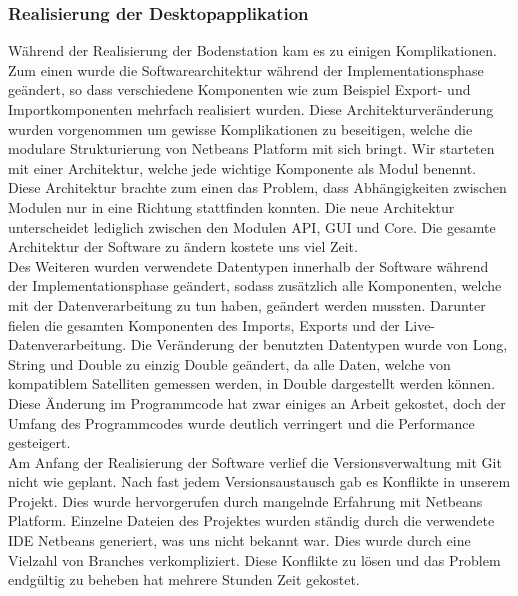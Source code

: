 \subsubsection{Realisierung der Desktopapplikation}
Während der Realisierung der Bodenstation kam es zu einigen Komplikationen. Zum einen wurde die Softwarearchitektur während der Implementationsphase geändert, so dass verschiedene Komponenten wie zum Beispiel Export- und Importkomponenten mehrfach realisiert wurden. Diese Architekturveränderung wurden vorgenommen um gewisse Komplikationen zu beseitigen, welche die modulare Strukturierung von Netbeans Platform mit sich bringt. Wir starteten mit einer Architektur, welche jede wichtige Komponente als Modul benennt. Diese Architektur brachte zum einen das Problem, dass Abhängigkeiten zwischen Modulen nur in eine Richtung stattfinden konnten. Die neue Architektur unterscheidet lediglich zwischen den Modulen API, GUI und Core. Die gesamte Architektur der Software zu ändern kostete uns viel Zeit.\\
Des Weiteren wurden verwendete Datentypen innerhalb der Software während der Implementationsphase geändert, sodass zusätzlich alle Komponenten, welche mit der Datenverarbeitung zu tun haben, geändert werden mussten. Darunter fielen die gesamten Komponenten des Imports, Exports und der Live-Datenverarbeitung. Die Veränderung der benutzten Datentypen wurde von Long, String und Double zu einzig Double geändert, da alle Daten, welche von kompatiblem Satelliten gemessen werden, in Double dargestellt werden können. Diese Änderung im Programmcode hat zwar einiges an Arbeit gekostet, doch der Umfang des Programmcodes wurde deutlich verringert und die Performance gesteigert.\\
Am Anfang der Realisierung der Software verlief die Versionsverwaltung mit Git nicht wie geplant. Nach fast jedem Versionsaustausch gab es Konflikte in unserem Projekt. Dies wurde hervorgerufen durch mangelnde Erfahrung mit Netbeans Platform. Einzelne Dateien des Projektes wurden ständig durch die verwendete IDE Netbeans generiert, was uns nicht bekannt war. Dies wurde durch eine Vielzahl von Branches verkompliziert. Diese Konflikte zu lösen und das Problem endgültig zu beheben hat mehrere Stunden Zeit gekostet.